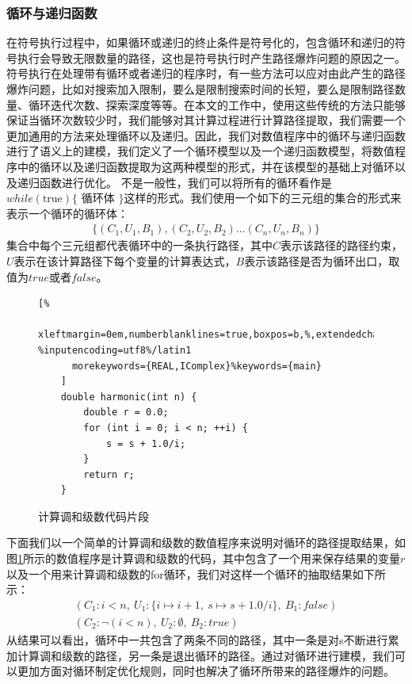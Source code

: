 \subsubsection{循环与递归函数}

在符号执行过程中，如果循环或递归的终止条件是符号化的，包含循环和递归的符号执行会导致无限数量的路径，这也是符号执行时产生路径爆炸问题的原因之一。符号执行在处理带有循环或者递归的程序时，有一些方法可以应对由此产生的路径爆炸问题，比如对搜索加入限制，要么是限制搜索时间的长短，要么是限制路径数量、循环迭代次数、探索深度等等。在本文的工作中，使用这些传统的方法只能够保证当循环次数较少时，我们能够对其计算过程进行计算路径提取，我们需要一个更加通用的方法来处理循环以及递归。因此，我们对数值程序中的循环与递归函数进行了语义上的建模，我们定义了一个循环模型以及一个递归函数模型，将数值程序中的循环以及递归函数提取为这两种模型的形式，并在该模型的基础上对循环以及递归函数进行优化。
不是一般性，我们可以将所有的循环看作是 $while(\text{true}) \{$ 循环体 $\}$这样的形式。我们使用一个如下的三元组的集合的形式来表示一个循环的循环体：
\begin{align*}
    \{(C_1, U_1, B_1), (C_2, U_2, B_2) ... (C_n, U_n, B_n)\}
\end{align*}
集合中每个三元组都代表循环中的一条执行路径，其中$C$表示该路径的路径约束，$U$表示在该计算路径下每个变量的计算表达式，$B$表示该路径是否为循环出口，取值为$true$或者$false$。


\begin{figure}[htbp]
  \centering
  \begin{lstlisting}[%
      xleftmargin=0em,numberblanklines=true,boxpos=b,%,extendedchars=\true, %inputencoding=utf8%/latin1
      morekeywords={REAL,IComplex}%keywords={main}
    ]
    double harmonic(int n) {
        double r = 0.0;
        for (int i = 0; i < n; ++i) {
            s = s + 1.0/i;
        }
        return r;
    }
  \end{lstlisting}
  \caption{计算调和级数代码片段}\label{lst:harmoniccode}
\end{figure}

下面我们以一个简单的计算调和级数的数值程序来说明对循环的路径提取结果，如图\ref{lst:harmoniccode}所示的数值程序是计算调和级数的代码，其中包含了一个用来保存结果的变量$r$以及一个用来计算调和级数的for循环，我们对这样一个循环的抽取结果如下所示：
\begin{gather*}
  (C_1: i<n,\ U_1:\{i \mapsto i+1,\ s \mapsto s + 1.0/i\},\ B_1: false) \\
  (C_2: \neg(i<n),\ U_2: \emptyset ,\ B_2: true)
\end{gather*}
从结果可以看出，循环中一共包含了两条不同的路径，其中一条是对s不断进行累加计算调和级数的路径，另一条是退出循环的路径。通过对循环进行建模，我们可以更加方面对循环制定优化规则，同时也解决了循环所带来的路径爆炸的问题。
 
